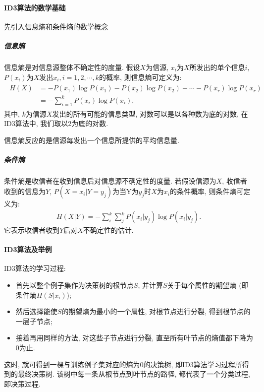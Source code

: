 \paragraph{ID3算法的数学基础}
先引入信息熵和条件熵的数学概念
\subparagraph{信息熵}
信息熵是对信息源整体不确定性的度量. 假设$X$为信源, $x_i$为$X$所发出的单个信息$i$, $P (x_i)$为$X$发出$x_i, i=1,2,\cdots,k$的概率, 则信息熵可定义为:
\begin{align}
  \begin{aligned}
    H (X) &=-P\left (x_{1}\right) \log P\left (x_{1}\right)-P\left (x_{2}\right) \log P\left (x_{2}\right)-\cdots-P\left (x_{r}\right) \log P\left (x_{r}\right) \\
                       &=-\sum_{i=1}^{k} P\left (x_{i}\right) \log P\left (x_{i}\right),
  \end{aligned}
\end{align}
其中, $k$为信源$X$发出的所有可能的信息类型, 对数可以是以各种数为底的对数, 在ID3算法中, 我们取以2为底的对数.
\begin{remark}
 信息熵反应的是信源每发出一个信息所提供的平均信息量.
\end{remark}
\subparagraph{条件熵}
条件熵是收信者在收到信息后对信息源不确定性的度量.
若假设信源为$X$, 收信者收到的信息为$Y$, $P (X=x_i|Y=y_j)$为当Y为$y_j$时$X$为$x_i$的条件概率, 则条件熵可定义为:
\begin{align}
    H (X | Y)=-\sum_{i}^{k} \sum_{j}^{k} P\left (x_{i} | y_{j}\right) \log P\left (x_{i} | y_{j}\right).
\end{align}
它表示收信者收到$Y$后对$X$不确定性的估计.

\paragraph{ID3算法及举例} 

ID3算法的学习过程:
\begin{itemize}
\item 首先以整个例子集作为决策树的根节点$S$, 并计算$S$关于每个属性的期望熵 (即条件熵$H(S|x_i)$);
\item 然后选择能使$S$的期望熵为最小的一个属性, 对根节点进行分裂, 得到根节点的一层子节点;
\item 接着再用同样的方法, 对这些子节点进行分裂, 直至所有叶节点的熵值都下降为0为止.
\end{itemize}
\begin{remark}
    这时, 就可得到一棵与训练例子集对应的熵为0的决策树, 即ID3算法学习过程所得到的最终决策树. 该树中每一条从根节点到叶节点的路径, 都代表了一个分类过程, 即决策过程.
\end{remark}

